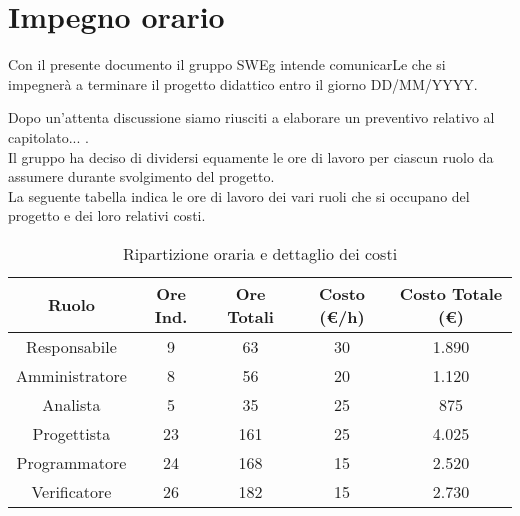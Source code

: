 \section{Impegno orario}

Con il presente documento il gruppo SWEg intende comunicarLe che si impegner\`a a terminare il progetto didattico entro il giorno DD/MM/YYYY.

Dopo un'attenta discussione siamo riusciti a elaborare un preventivo relativo al capitolato... .\\
Il gruppo ha deciso di dividersi equamente le ore di lavoro per ciascun ruolo da assumere durante svolgimento del progetto.\\
La seguente tabella indica le ore di lavoro dei vari ruoli che si occupano del progetto e dei loro relativi costi.

\vspace{0.5cm}

\begin{table}[h]
    \centering
    \begin{tabular}{|c|c|c|c|c|}
        \hline
        \rowcolor[gray]{0.9}
        \textbf{Ruolo} & \textbf{Ore Ind.} & \textbf{Ore Totali} & \textbf{Costo (\euro/h)} & \textbf{Costo Totale (\euro)} \\
        \hline
        Responsabile & 9 & 63 & 30 & 1.890 \\
        \hline
        Amministratore & 8 & 56 & 20 & 1.120 \\
        \hline
        Analista & 5 & 35 & 25 & 875 \\
        \hline
        Progettista & 23 & 161 & 25 & 4.025 \\
        \hline
        Programmatore & 24 & 168 & 15 & 2.520 \\
        \hline
        Verificatore & 26 & 182 & 15 & 2.730 \\
        \hline
    \end{tabular}
\caption{Ripartizione oraria e dettaglio dei costi}
\end{table}

